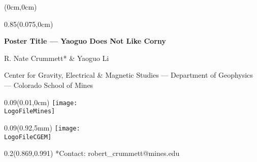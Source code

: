 \documentclass[dark]{cgem-poster}
\makeatletter
\newcommand{\PosterTitle}{Poster Title --- Yaoguo Does Not Like Corny}
\newcommand{\PosterFirstAuthor}{R. Nate Crummett}
\newcommand{\PosterFirstAuthorContact}{robert\_crummett@mines.edu}
\newcommand{\PosterSecondAuthor}{Yaoguo Li}
\newcommand{\PosterAffiliationCGEM}{Center for Gravity, Electrical \& Magnetic Studies}
\newcommand{\PosterAffiliationMines}{Colorado School of Mines}
\newcommand{\PosterAffiliationGeophysics}{Department of Geophysics}
\makeatother
\begin{document}

  \newcommand{\titleheight}{0.09\pageheight}
  \newcommand{\PosterCGEMLogoHeight}{\dimexpr(\titleheight - 12mm)\relax}
  
  \begin{textblock*}{\pagewidth}(0cm,0cm)
    \begin{minipage}[t][\titleheight{}][t]{\pagewidth}
    \end{minipage}
  \end{textblock*}
  
  \begin{textblock*}{0.85\pagewidth}(0.075\pagewidth,0cm)
    \begin{center}
      \vspace{5mm}
      \Large
      \textbf{
        \PosterTitle{}
      }
      \par
      \vspace{5mm}
      \normalsize
      { \color{PosterSubtitleColor}
        \PosterFirstAuthor{}* \& \PosterSecondAuthor{}
        \par
        \small
        \PosterAffiliationCGEM{} --- %
          \PosterAffiliationGeophysics{} --- %
          \PosterAffiliationMines{}
      }
    \end{center}
  \end{textblock*}
  
  \begin{textblock*}{\titleheight{}}(0.01\pagewidth,0cm)
    \centering
    \hspace*{-20.72449pt}
    \texttt{[image: \\LogoFileMines]}
  \end{textblock*}
  
  \begin{textblock*}{\titleheight{}}(0.92\pagewidth,5mm)
    \centering
    \texttt{[image: \\LogoFileCGEM]}
  \end{textblock*}

  \begin{textblock*}{0.2\pagewidth}(0.869\pagewidth,0.991\pageheight)
    \tiny
    { \color{PosterSubtitleColor}
      *Contact: %
      \PosterFirstAuthorContact{}
    }
  \end{textblock*}
  
\end{document}
